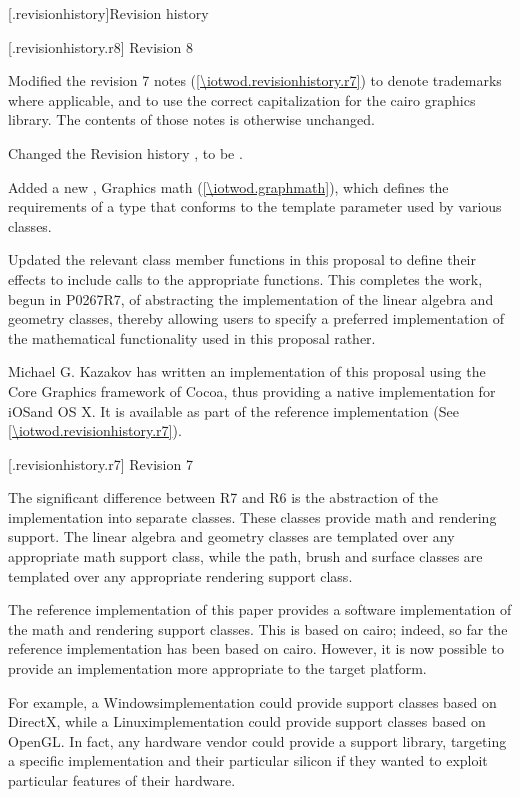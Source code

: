 \addtocounter{chapter}{-1} %
[\iotwod.revisionhistory]{Revision history}

 [\iotwod.revisionhistory.r8] {Revision 8}

\pnum
Modified the revision 7 notes (\ref{\iotwod.revisionhistory.r7}) to denote trademarks where applicable, and to use the correct capitalization for the cairo graphics library. The contents of those notes is otherwise unchanged.

\pnum
Changed the Revision history \clause, to be .

\pnum
Added a new \clause, Graphics math (\ref{\iotwod.graphmath}), which defines the requirements of a type that conforms to the \graphicsmathtemplparam template parameter used by various classes.

\pnum
Updated the relevant class member functions in this proposal to define their effects to include calls to the appropriate \graphicsmathtemplparam functions. This completes the work, begun in P0267R7, of abstracting the implementation of the linear algebra and geometry classes, thereby allowing users to specify a preferred implementation of the mathematical functionality used in this proposal rather.

\pnum
Michael G. Kazakov has written an implementation of this proposal using the Core Graphics framework of Cocoa\textregistered, thus providing a native implementation for iOS\textregistered and OS X\textregistered. It is available as part of the reference implementation (See \ref{\iotwod.revisionhistory.r7}).

 [\iotwod.revisionhistory.r7] {Revision 7}

\pnum
The significant difference between R7 and R6 is the abstraction of the implementation into separate classes. These classes provide math and rendering support. The linear algebra and geometry classes are templated over any appropriate math support class, while the path, brush and surface classes are templated over any appropriate rendering support class.

\pnum
The reference implementation of this paper provides a software implementation of the math and rendering support classes. This is based on cairo; indeed, so far the reference implementation has been based on cairo. However, it is now possible to provide an implementation more appropriate to the target platform.

\pnum
For example, a Windows\textregistered implementation could provide support classes based on DirectX\textregistered, while a Linux\textregistered implementation could provide support classes based on OpenGL\textregistered. In fact, any hardware vendor could provide a support library, targeting a specific implementation and their particular silicon if they wanted to exploit particular features of their hardware.

